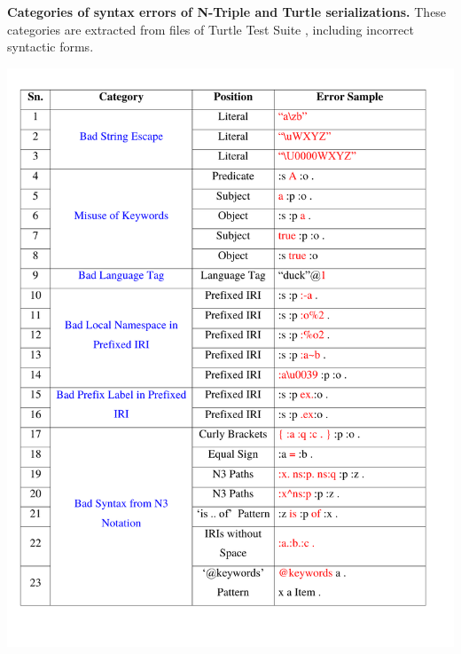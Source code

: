 \begin{appendices}
 \begin{table}[H]
 	\caption{\textbf{Categories of syntax errors of N-Triple and Turtle serializations.} These categories are extracted from files of Turtle Test Suite \cite{TurtleTests:Online}, including   incorrect syntactic forms.}
 \label{tab:syntaxErrorCate}
 	\centering
\includegraphics[width=5.5in]{images/firstPageBigTable.pdf}
\end{table}


\end{appendices}
